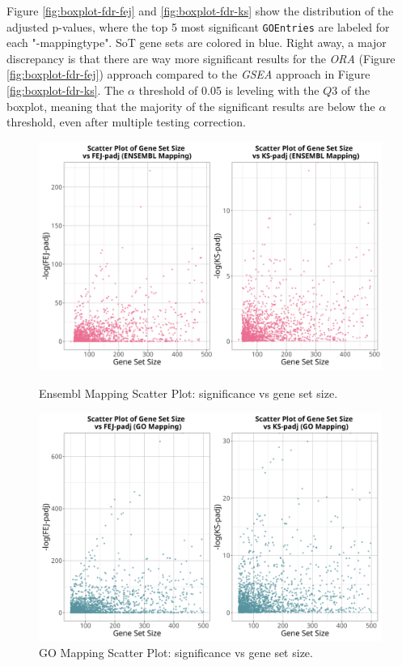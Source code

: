 \documentclass[12pt]{article}
\begin{document}
Figure \ref{fig:boxplot-fdr-fej} and \ref{fig:boxplot-fdr-ks} show the distribution of the
adjusted p-values, where the top 5 most significant \texttt{GOEntries} are labeled for each 
"-mappingtype". SoT gene sets are colored in blue.
Right away, a major discrepancy is that there are way more significant results 
for the \textit{ORA} (Figure \ref{fig:boxplot-fdr-fej}) approach compared to 
the \textit{GSEA} approach in Figure \ref{fig:boxplot-fdr-ks}.
The $\alpha$ threshold of 0.05 is leveling with the $Q3$ of the boxplot, meaning
that the majority of the significant results are below the $\alpha$ threshold,
even after multiple testing correction.

\begin{figure}[htpb]
    \centering
    \begin{minipage}{0.49\textwidth}
        \centering
        \includegraphics[width=\textwidth]{./plots/ensScatt.png}
        \caption{Ensembl Mapping Scatter Plot: significance vs gene set size.}
        \label{fig:ens-scatt}
    \end{minipage}
    \hfill
    \begin{minipage}{0.49\textwidth}
        \centering
        \includegraphics[width=\textwidth]{./plots/goScatt.png}
        \caption{GO Mapping Scatter Plot: significance vs gene set size.}
        \label{fig:go-scatt}
    \end{minipage}
\end{figure}
\end{document}
